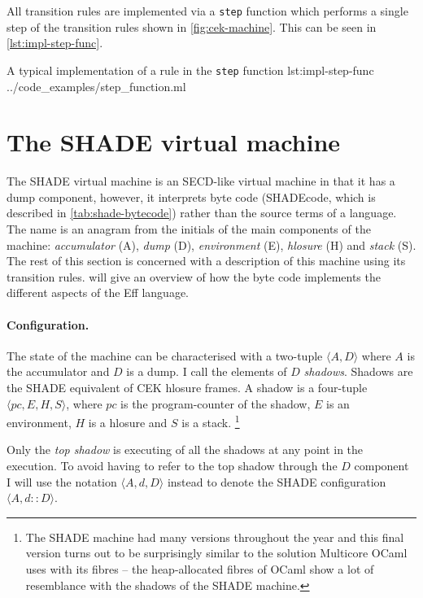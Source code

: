 \documentclass[class=article, crop=false]{standalone}
\begin{document}
All transition rules are implemented via a \lstinline{step} function which
performs a single step of the transition rules shown in
\autoref{fig:cek-machine}. This can be seen in \autoref{lst:impl-step-func}.

{A typical implementation of a rule in the \lstinline{step} function}
{lst:impl-step-func}
{../code_examples/step_function.ml}

\section{The SHADE virtual machine}
\label{sec:shade-machine}

The SHADE virtual machine is an SECD-like virtual machine in that it has a dump
component, however, it interprets byte code (SHADEcode, which is described in
\autoref{tab:shade-bytecode}) rather than the source terms of a language. The
name is an anagram from the initials of the main components of the machine: 
\emph{accumulator} (A), \emph{dump} (D), \emph{environment} (E),
\emph{hlosure} (H) and \emph{stack} (S). The rest of this section is concerned
with a description of this machine using its transition rules.
 will give an overview of how the byte code
implements the different aspects of the Eff language.

\paragraph{Configuration.}
The state of the machine can be characterised with a two-tuple
$\langle A, D \rangle$ where $A$ is the accumulator and $D$ is a dump. I call
the elements of $D$ \emph{shadows}. Shadows are the SHADE equivalent of CEK
hlosure frames. A shadow is a four-tuple $\langle pc, E, H, S \rangle$, where
$pc$ is the program-counter of the shadow, $E$ is an environment, $H$ is a
hlosure and $S$ is a stack.
\footnote{The SHADE machine had many versions throughout the year and this
final version turns out to be surprisingly similar to the solution Multicore
OCaml uses with its fibres -- the heap-allocated fibres of OCaml show a lot
of resemblance with the shadows of the SHADE machine.}

Only the \emph{top shadow} is executing of all the shadows at any point in the
execution. To avoid having to refer to the top shadow through the $D$ component
I will use the notation $\langle A, d, D \rangle$ instead to denote the SHADE
configuration $\langle A, d :: D \rangle$.
\end{document}
